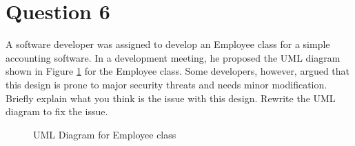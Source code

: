 \documentclass[12pt,letterpaper,twoside]{article}
\begin{document}
\section*{Question 6}

A software developer was assigned to develop an Employee class for a simple accounting software.
In a development meeting, he proposed the UML diagram shown in Figure \ref{fig1} for the Employee class.
Some developers, however, argued that this design is prone to major security threats and needs minor modification.
Briefly explain what you think is the issue with this design.
Rewrite the UML diagram to fix the issue.

\begin{figure}[H]
	\centering
	\caption{UML Diagram for Employee class}\label{fig1}
\end{figure}
\end{document}
